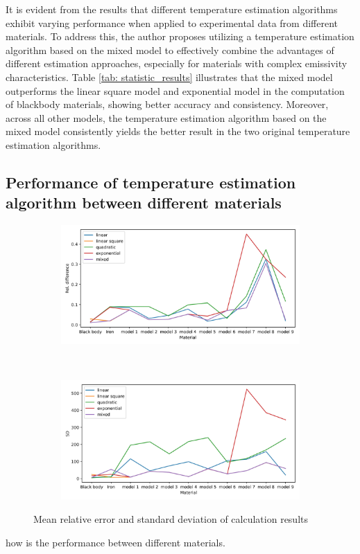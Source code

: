 It is evident from the results that different temperature estimation algorithms 
exhibit varying performance when applied to experimental data from different 
materials. To address this, the author proposes utilizing a temperature estimation 
algorithm based on the mixed model to effectively combine the advantages of 
different estimation approaches, especially for materials with complex emissivity 
characteristics. Table \ref{tab: statistic_results} illustrates that the mixed 
model outperforms the linear square model and exponential model in the 
computation of blackbody materials, showing better accuracy and consistency. 
Moreover, across all other models, the temperature estimation algorithm based 
on the mixed model consistently yields the better result in the two 
original temperature estimation algorithms.

\subsection{Performance of temperature estimation algorithm between different materials}

\begin{figure}[htbp]
    \centering
    \begin{subfigure}{\textwidth}
        \includegraphics[width=\textwidth]{figures/diff_rel.jpg}
    \end{subfigure}\\
    \begin{subfigure}{\textwidth}
        \includegraphics[width=\textwidth]{figures/diff_std.jpg}
    \end{subfigure}
    \caption{Mean relative error and standard deviation of calculation results}
    \label{fig: result_final_analysis}
\end{figure}

how is the performance between different materials.
